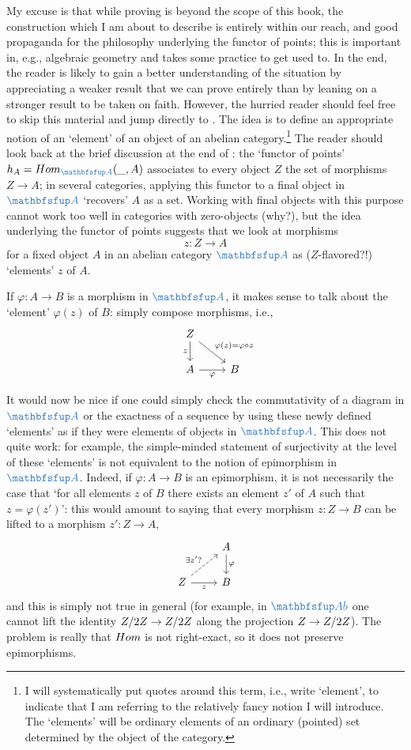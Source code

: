 My excuse is that while proving  is beyond the scope
of this book, the construction which I am about to describe is
entirely within our reach, and good propaganda for the philosophy
underlying the functor of points; this is important in, e.g.,
algebraic geometry and takes some practice to get used to. In the end,
the reader is likely to gain a better understanding of the situation
by appreciating a weaker result that we can prove entirely than by
leaning on a stronger result to be taken on faith. However, the
hurried reader should feel free to skip this material and jump
directly to .  The idea is to
define an appropriate notion of an `element' of an object of an
abelian category.\footnote{I will systematically put quotes around
  this term, i.e., write `element', to indicate that I am referring to
  the relatively fancy notion I will introduce. The `elements' will be
  ordinary elements of an ordinary (pointed) set determined by the
  object of the category.} The reader should look back at the brief
discussion at the end of :
the `functor of points' $h_A = \Hom_{\categ{A}}(\_, A)$ associates to
every object $Z$ the set of morphisms $Z \to A$; in several
categories, applying this functor to a final object in $\categ{A}$
`recovers' $A$ as a set. Working with final objects with this purpose
cannot work too well in categories with zero-objects (why?), but the
idea underlying the functor of points suggests that we look at
morphisms
\[
  z : Z \to A
\]
for a fixed object $A$ in an abelian category $\categ{A}$ as
($Z$-flavored?!) `elements' $z$ of $A$.

If $\varphi : A \to B$ is a morphism in $\categ{A}$, it makes sense to
talk about the `element' $\varphi(z)$ of $B$: simply compose
morphisms, i.e.,
\[\begin{tikzcd}
    & Z \arrow[d, "z"'] \arrow[dr, "\varphi(z) = \varphi \circ z"] & \\
    & A \arrow[r, "\varphi"'] & B
  \end{tikzcd}\]

It would now be nice if one could simply check the commutativity of a
diagram in $\categ{A}$ or the exactness of a sequence by using these
newly defined `elements' as if they were elements of objects in
$\categ{A}$. This does not quite work: for example, the simple-minded
statement of surjectivity at the level of these `elements' is not
equivalent to the notion of epimorphism in $\categ{A}$. Indeed, if
$\varphi : A \to B$ is an epimorphism, it is not necessarily the case
that `for all elements $z$ of $B$ there exists an element $z'$ of $A$
such that $z = \varphi(z')$': this would amount to saying that every
morphism $z : Z \to B$ can be lifted to a morphism $z' : Z \to A$,
\[\begin{tikzcd}
    & A \arrow[d, "\varphi"] \\
    Z \arrow[ur, dashed, "\exists z'?"] \arrow[r, "z"'] & B
  \end{tikzcd}\] and this is simply not true in general (for example,
in $\categ{Ab}$ one cannot lift the identity $Z/2Z \to Z/2Z$ along
the projection $Z \to Z/2Z$). The problem is really that $Hom$ is
not right-exact, so it does not preserve epimorphisms.

